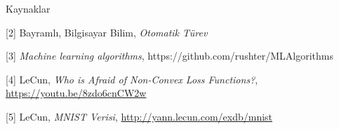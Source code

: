 \documentclass[12pt,fleqn]{article}\usepackage{../../common}
\begin{document}
Kaynaklar

[2] Bayramlı, Bilgisayar Bilim, {\em Otomatik Türev}

[3] {\em Machine learning algorithms}, https://github.com/rushter/MLAlgorithms

[4] LeCun, {\em Who is Afraid of Non-Convex Loss Functions?}, \url{https://youtu.be/8zdo6cnCW2w}

[5] LeCun, {\em MNIST Verisi}, \url{http://yann.lecun.com/exdb/mnist}
\end{document}

